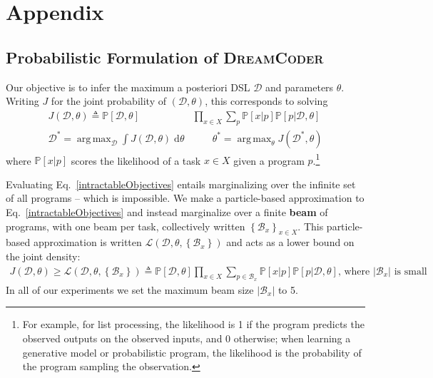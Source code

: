 \documentclass{article}
\newcommand{\system}{\textsc{DreamCoder}~}
\newcommand{\lowerBound}{\mathscr{L}}
\DeclareMathOperator*{\argmax}{arg\,max} %
\newcommand{\probability}{\mathds{P}} %
\begin{document}



\appendix

\section{Appendix}

\subsection{Probabilistic Formulation of \system}\label{probabilisticAppendix}
Our objective is to infer the maximum a posteriori DSL $\mathcal{D}$ and
parameters $\theta$. Writing $J$ for the joint probability of $(\mathcal{D},\theta)$,
this corresponds to solving
\begin{align}\label{intractableObjectives}
\nonumber  J(\mathcal{D},\theta)\triangleq \probability[\mathcal{D},\theta]&\prod_{x\in X} \sum_p \probability[x|p]\probability[p|\mathcal{D},\theta]\\
  \mathcal{D}^* = \argmax_{\mathcal{D}}\int J(\mathcal{D},\theta)\;\mathrm{d}\theta& \qquad
  \theta^* =\argmax_\theta J(\mathcal{D}^*,\theta)
\end{align}
where $\probability[x|p]$ scores the likelihood of a task
$x\in X$ given a program $p$.\footnote{For example, for list
  processing, the likelihood is 1 if the program predicts the observed
  outputs on the observed inputs, and 0 otherwise; when learning a
  generative model or probabilistic program, the likelihood is the
  probability of the program sampling the observation.}

Evaluating Eq.~\ref{intractableObjectives}
entails marginalizing over the infinite set of all programs -- which is impossible.
We make a particle-based approximation to Eq.~\ref{intractableObjectives}
and instead marginalize over a finite \textbf{beam} of programs,
with one beam per task, collectively written $\left\{\mathcal{B}_x \right\}_{x\in X}$.
This particle-based approximation is written $\lowerBound (\mathcal{D},\theta,\left\{\mathcal{B}_x \right\})$
and acts as a lower bound on the joint density:
\begin{align}
 J(\mathcal{D},\theta)\geq \lowerBound  (\mathcal{D},\theta,\left\{\mathcal{B}_x \right\})\triangleq\probability[\mathcal{D},\theta]\prod_{x\in X} \sum_{p\in \mathcal{B}_x} \probability[x|p]\probability[p|\mathcal{D},\theta]\text{, where $|\mathcal{B}_x|$ is small}
\end{align}
In all of our experiments we set the maximum beam size $|\mathcal{B}_x|$ to 5.
\end{document}
